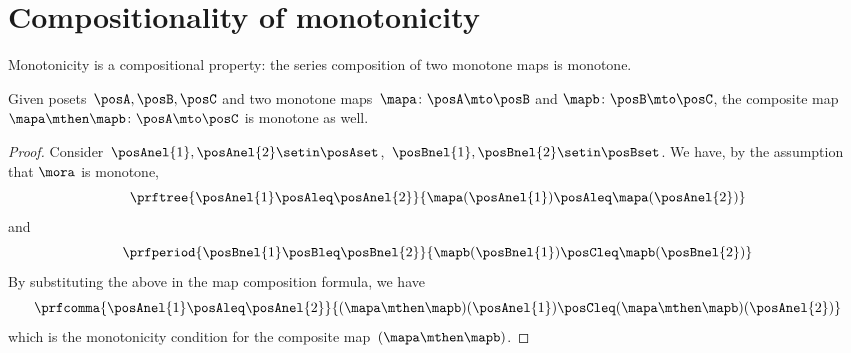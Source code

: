 
\section{Compositionality of monotonicity}
Monotonicity is a compositional property: the series composition of two monotone maps is monotone.
\begin{lemma}\label{lem:monotonicity-compositional}
    Given posets~$\posA,\posB,\posC$ and two monotone maps~$\mapa\colon \posA \mto \posB$ and $\mapb\colon \posB \mto \posC$, the composite map~$\mapa\mthen \mapb\colon \posA \mto \posC$ is monotone as well.
\end{lemma}
\begin{proof}
    Consider~$\posAnel{1},\posAnel{2} \setin \posAset$,~$\posBnel{1},\posBnel{2}\setin \posBset$.
    We have, by the assumption that $\mora$ is monotone,
    \begin{equation}\label{eq:monotonicity-compositional-1}
        \prftree{\posAnel{1}\posAleq \posAnel{2}}{\mapa(\posAnel{1})\posAleq \mapa(\posAnel{2})}
    \end{equation}
    and
    \begin{equation}\label{eq:monotonicity-compositional-2}
        \prfperiod{\posBnel{1}\posBleq \posBnel{2}}{\mapb(\posBnel{1})\posCleq \mapb(\posBnel{2})}
    \end{equation}
    By substituting the above in the map composition formula, we have
    \begin{equation}\label{eq:monotonicity-compositional-3}
        \prfcomma{\posAnel{1}\posAleq \posAnel{2} }{ (\mapa\mthen \mapb)(\posAnel{1}) \posCleq (\mapa\mthen \mapb)(\posAnel{2})}
    \end{equation}
    which is the monotonicity condition for the composite map~$(\mapa\mthen\mapb)$.
\end{proof}
